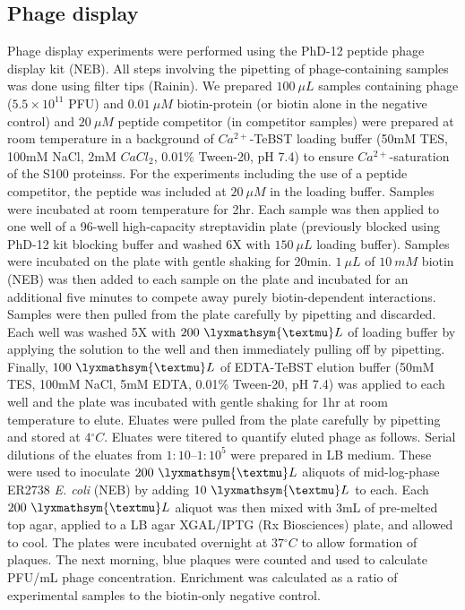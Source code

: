 \subsection{Phage display}

Phage display experiments were performed using the PhD-12 peptide
phage display kit (NEB). All steps involving the pipetting of phage-containing
samples was done using filter tips (Rainin). We prepared $100\ \mu L$
samples containing phage ($5.5\times10^{11}$ PFU) and $0.01\ \mu M$
biotin-protein (or biotin alone in the negative control) and $20\ \mu M$
peptide competitor (in competitor samples) were prepared at room temperature
in a background of $Ca^{2+}$-TeBST loading buffer (50mM TES, 100mM
NaCl, 2mM $CaCl_{2}$, 0.01\% Tween-20, pH 7.4) to ensure $Ca^{2+}$-saturation
of the S100 proteinss. For the experiments including the use of a
peptide competitor, the peptide was included at $20\ \mu M$ in the
loading buffer. Samples were incubated at room temperature for 2hr.
Each sample was then applied to one well of a 96-well high-capacity
streptavidin plate (previously blocked using PhD-12 kit blocking buffer
and washed 6X with $150\ \mu L$ loading buffer). Samples were incubated
on the plate with gentle shaking for 20min. $1\ \mu L$ of $10\ mM$
biotin (NEB) was then added to each sample on the plate and incubated
for an additional five minutes to compete away purely biotin-dependent
interactions. Samples were then pulled from the plate carefully by
pipetting and discarded. Each well was washed 5X with $200\ \lyxmathsym{\textmu}L$
of loading buffer by applying the solution to the well and then immediately
pulling off by pipetting. Finally, $100\ \lyxmathsym{\textmu}L$ of
EDTA-TeBST elution buffer (50mM TES, 100mM NaCl, 5mM EDTA, 0.01\%
Tween-20, pH 7.4) was applied to each well and the plate was incubated
with gentle shaking for 1hr at room temperature to elute. Eluates
were pulled from the plate carefully by pipetting and stored at $4{^\circ}C$.
Eluates were titered to quantify eluted phage as follows. Serial dilutions
of the eluates from $1:10$--$1:10^{5}$ were prepared in LB medium. These
were used to inoculate $200\ \lyxmathsym{\textmu}L$ aliquots of mid-log-phase
ER2738 \textit{E. coli} (NEB) by adding $10\ \lyxmathsym{\textmu}L$
to each. Each $200\ \lyxmathsym{\textmu}L$ aliquot was then mixed
with 3mL of pre-melted top agar, applied to a LB agar XGAL/IPTG (Rx
Biosciences) plate, and allowed to cool. The plates were incubated
overnight at $37{^\circ}C$ to allow formation of plaques. The next
morning, blue plaques were counted and used to calculate PFU/mL phage
concentration. Enrichment was calculated as a ratio of experimental
samples to the biotin-only negative control. 

